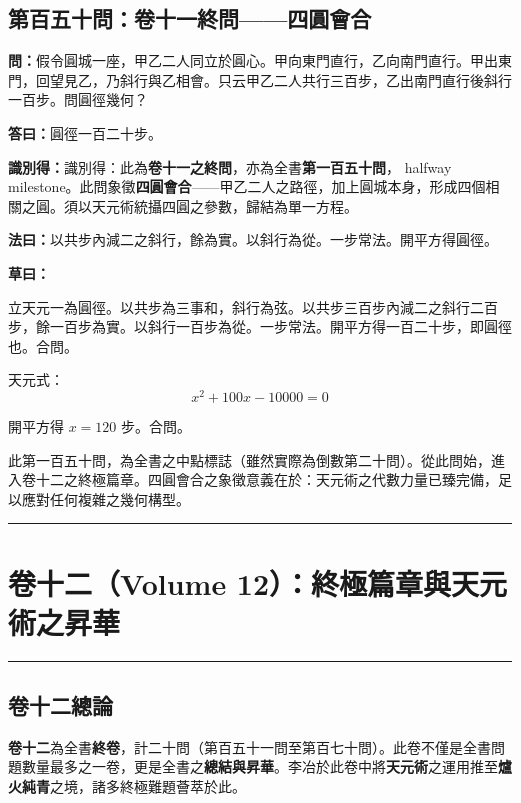 \documentclass[11pt,a4paper]{article}
\newcommand{\longline}{\noindent\rule{\textwidth}{0.4pt}}
\newcommand{\wen}[1]{\par\noindent\textbf{\textcolor{probcolor}{問：}}{#1}\par}
\newcommand{\da}[1]{\par\noindent\textbf{\textcolor{anscolor}{答曰：}}{#1}\par}
\newcommand{\fayue}[1]{\par\noindent\textbf{\textcolor{methodcolor}{法曰：}}{#1}\par}
\newcommand{\caoyue}[1]{\par\noindent\textbf{草曰：}{#1}\par}
\newcommand{\zhi}[1]{\par\noindent\textbf{識別得：}{#1}\par}
\begin{document}
\subsection*{第百五十問：卷十一終問——四圓會合}
\wen{假令圓城一座，甲乙二人同立於圓心。甲向東門直行，乙向南門直行。甲出東門，回望見乙，乃斜行與乙相會。只云甲乙二人共行三百步，乙出南門直行後斜行一百步。問圓徑幾何？}

\da{圓徑一百二十步。}

\zhi{識別得：此為\textbf{卷十一之終問}，亦為全書\textbf{第一百五十問}， halfway milestone。此問象徵\textbf{四圓會合}——甲乙二人之路徑，加上圓城本身，形成四個相關之圓。須以天元術統攝四圓之參數，歸結為單一方程。}

\fayue{以共步內減二之斜行，餘為實。以斜行為從。一步常法。開平方得圓徑。}

\caoyue{
立天元一為圓徑。以共步為三事和，斜行為弦。以共步三百步內減二之斜行二百步，餘一百步為實。以斜行一百步為從。一步常法。開平方得一百二十步，即圓徑也。合問。

天元式：
$$x^2 + 100x - 10000 = 0$$

開平方得 $x = 120$ 步。合問。

此第一百五十問，為全書之中點標誌（雖然實際為倒數第二十問）。從此問始，進入卷十二之終極篇章。四圓會合之象徵意義在於：天元術之代數力量已臻完備，足以應對任何複雜之幾何構型。
}

\vspace{0.5cm}
\longline

\newpage

\section{卷十二（Volume 12）：終極篇章與天元術之昇華}
\label{sec:vol12}

\longline

\subsection*{卷十二總論}

\begin{framed}
\noindent\textbf{卷十二}為全書\textbf{終卷}，計二十問（第百五十一問至第百七十問）。此卷不僅是全書問題數量最多之一卷，更是全書之\textbf{總結與昇華}。李冶於此卷中將\textbf{天元術}之運用推至\textbf{爐火純青}之境，諸多終極難題薈萃於此。
\end{framed}
\end{document}
